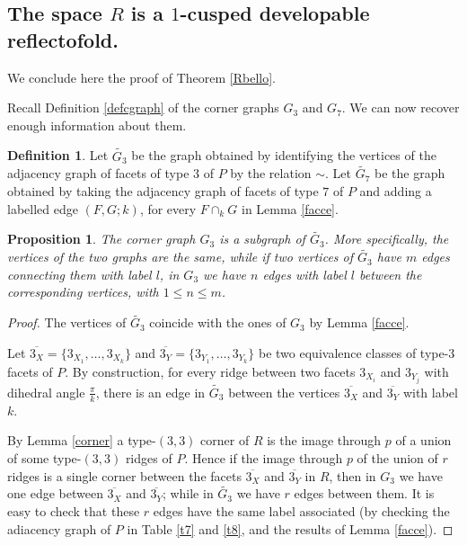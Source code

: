 \documentclass{amsart}
\newtheorem{prop}[lemma]{Proposition}
\theoremstyle{definition}
\newtheorem{defn}[lemma]{Definition}
\theoremstyle{remark}
\begin{document}
\subsection{The space \texorpdfstring{$R$}{R} is a \texorpdfstring{$1$}{1}-cusped developable reflectofold.}\label{ref3}
We conclude here the proof of Theorem \ref{Rbello}.

Recall Definition \ref{defcgraph} of the corner graphs $G_3$ and $G_7$. We can now recover enough information about them.

\begin{defn}
Let $\widetilde{G_3}$ be the graph obtained by identifying the vertices of the adjacency graph of facets of type $3$ of $P$ by the relation $\sim$.
Let $\widetilde{G_7}$ be the graph obtained by taking the adjacency graph of facets of type $7$ of $P$ and adding a labelled edge $(F,G;k)$, for every $F\cap_k G$ in Lemma \ref{facce}.    
\end{defn}

\begin{prop}
\label{G3}
    The corner graph $G_3$ is a subgraph of $\widetilde{G_3}$. More specifically, the vertices of the two graphs are the same, while if two vertices of $\widetilde{G_3}$ have $m$ edges connecting them with label $l$, in $G_3$ we have $n$ edges with label $l$ between the corresponding vertices, with $1\le n \le m$.
\end{prop}
\begin{proof}
    The vertices of $\widetilde{G_3}$ coincide with the ones of $G_3$ by Lemma \ref{facce}.

    Let $\overline{3_X}=\{3_{X_1},\dots,3_{X_k}\}$ and $\overline{3_Y}=\{3_{Y_1},\dots,3_{Y_k}\}$ be two equivalence classes of type-$3$ facets of $P$.
    By construction, for every ridge between two facets $3_{X_i}$ and $3_{Y_j}$ with dihedral angle $\frac{\pi}{k}$, there is an edge in $\widetilde{G_3}$ between the vertices $\overline{3_X}$ and $\overline{3_Y}$ with label $k$.

    By Lemma \ref{corner} a type-$(3,3)$ corner of $R$ is the image through $p$ of a union of some type-$(3,3)$ ridges of $P$. Hence if the image through $p$ of the union of $r$ ridges is a single corner between the facets $\overline{3_X}$ and $\overline{3_Y}$ in $R$, then in $G_3$ we have one edge between $\overline{3_X}$ and $\overline{3_Y}$; while in $\widetilde{G_3}$ we have $r$ edges between them. It is easy to check that these $r$ edges have the same label associated (by checking the adiacency graph of $P$ in Table \ref{t7} and \ref{t8}, and the results of Lemma \ref{facce}).
\end{proof}
\end{document}
